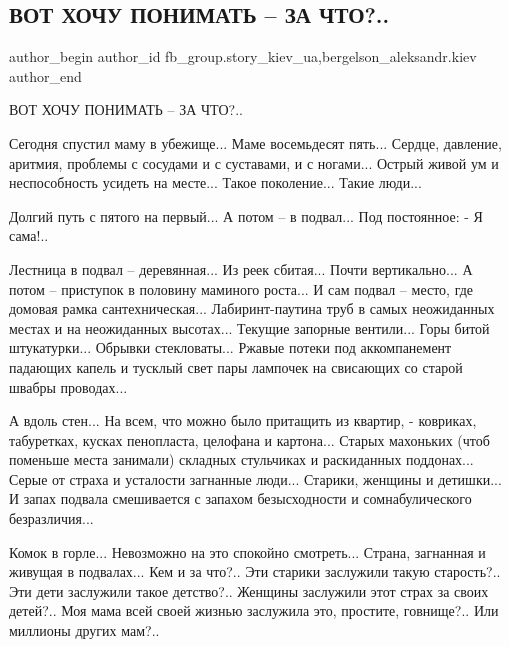  
 
 
 
 
 
\subsection{ВОТ ХОЧУ ПОНИМАТЬ – ЗА ЧТО?..}
\label{sec:27_02_2022.fb.fb_group.story_kiev_ua.2.za_chto}
 
\ifcmt
 author_begin
   author_id fb_group.story_kiev_ua,bergelson_aleksandr.kiev
 author_end
\fi

ВОТ ХОЧУ ПОНИМАТЬ – ЗА ЧТО?..

Сегодня спустил маму в убежище... Маме восемьдесят пять... Сердце, давление,
аритмия, проблемы с сосудами и с суставами, и с ногами... Острый живой ум и
неспособность усидеть на месте... Такое поколение... Такие люди...

Долгий путь с пятого на первый... А потом – в подвал... Под постоянное: - Я сама!..


Лестница в подвал – деревянная... Из реек сбитая... Почти вертикально... А потом –
приступок в половину маминого роста... И сам подвал – место, где домовая рамка
сантехническая... Лабиринт-паутина труб в самых неожиданных местах и на
неожиданных высотах... Текущие запорные вентили... Горы битой штукатурки... Обрывки
стекловаты... Ржавые потеки под аккомпанемент падающих капель и тусклый свет пары
лампочек на свисающих со старой швабры проводах...

А вдоль стен... На всем, что можно было притащить из квартир, - ковриках,
табуретках, кусках пенопласта, целофана и картона... Старых махоньких (чтоб
поменьше места занимали) складных стульчиках и раскиданных поддонах... Серые от
страха и усталости загнанные люди... Старики, женщины и детишки... И запах подвала
смешивается с запахом безысходности и сомнабулического безразличия...

Комок в горле... Невозможно на это спокойно смотреть... Страна, загнанная и живущая
в подвалах... Кем и за что?.. Эти старики заслужили такую старость?.. Эти дети
заслужили такое детство?.. Женщины заслужили этот страх за своих детей?.. Моя
мама всей своей жизнью заслужила это, простите, говнище?.. Или миллионы других
мам?..

